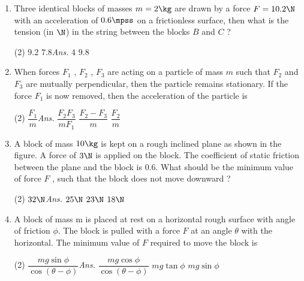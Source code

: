 \documentclass{article}
\newcommand{\ans}{\textcolor{red!95}{\textit{\quad Ans.}}}
\begin{document}
\begin{enumerate}
\item Three identical blocks of masses $m = 2 \kg$ are drawn by a force $F=10.2 \N$ with an acceleration of $0.6 \mpss$ on a frictionless surface, then what is the tension (in $\N$) in the string between the blocks $B$ and $C$ ?
\begin{center}
\end{center}	
\begin{tasks}(2)
	\task $9.2$
	\task $7.8$\ans
	\task $4$
	\task $9.8$
\end{tasks}

\item When forces $F_1$ , $F_2$ , $F_3$ are acting on a particle
of mass $m$ such that $F_2$ and $F_3$ are mutually perpendicular, then the particle remains stationary. If the force $F_1$ is now removed, then the acceleration of the particle is
\begin{tasks}(2)
	\task $\dfrac{F_1}{m}$\ans
	\task $\dfrac{F_2F_3}{mF_1}$
	\task $\dfrac{F_2-F_3}{m}$
	\task $\dfrac{F_2}{m}$
\end{tasks}

\item A block of mass $10\kg$ is kept on a rough inclined plane as shown in the figure. A force of $3 \N$ is applied on the block. The coefficient of static friction between the plane and the block is $0.6$. What should be the minimum value of force $F$ , such that the block does not move downward ?
\begin{center}
\end{center}
\begin{tasks}(2)
	\task $32\N$\ans
	\task $25\N$
	\task $23\N$
	\task $18\N$
\end{tasks}

\item A block of mass m is placed at rest on a horizontal rough surface with angle of friction $\phi$. The block is pulled with a force $F$ at an angle $\theta$ with the horizontal. The minimum value of $F$ required to move the block is
\begin{tasks}(2)
	\task $\dfrac{mg\sin\phi}{\cos(\theta-\phi)}$\ans
	\task $\dfrac{mg\cos\phi}{\cos(\theta-\phi)}$
	\task $mg\tan\phi$
	\task $mg\sin\phi$
\end{tasks}


\end{enumerate}
\end{document}
